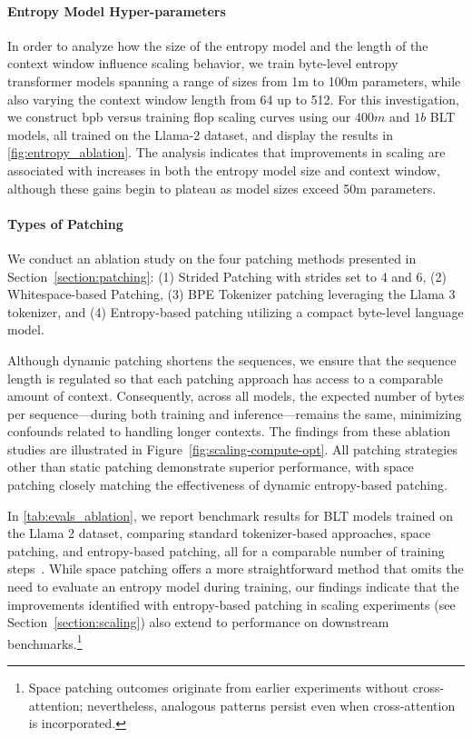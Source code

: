 \paragraph{Entropy Model Hyper-parameters} In order to analyze how the size of the entropy model and the length of the context window influence scaling behavior, we train byte-level entropy transformer models spanning a range of sizes from 1m to 100m parameters, while also varying the context window length from 64 up to 512. For this investigation, we construct bpb versus training flop scaling curves using our $400m$ and $1b$ {\textsc BLT} models, all trained on the Llama-2 dataset, and display the results in \autoref{fig:entropy_ablation}. The analysis indicates that improvements in scaling are associated with increases in both the entropy model size and context window, although these gains begin to plateau as model sizes exceed 50m parameters.

\paragraph{Types of Patching}

We conduct an ablation study on the four patching methods presented in Section~\ref{section:patching}: (1) Strided Patching with strides set to 4 and 6, (2) Whitespace-based Patching, (3) BPE Tokenizer patching leveraging the Llama 3 tokenizer, and (4) Entropy-based patching utilizing a compact byte-level language model.

Although dynamic patching shortens the sequences, we ensure that the sequence length is regulated so that each patching approach has access to a comparable amount of context. Consequently, across all models, the expected number of bytes per sequence—during both training and inference—remains the same, minimizing confounds related to handling longer contexts. The findings from these ablation studies are illustrated in Figure~\ref{fig:scaling-compute-opt}. All patching strategies other than static patching demonstrate superior performance, with space patching closely matching the effectiveness of dynamic entropy-based patching.

In \autoref{tab:evals_ablation}, we report benchmark results for {\textsc BLT} models trained on the Llama 2 dataset, comparing standard tokenizer-based approaches, space patching, and entropy-based patching, all for a comparable number of training steps~\citep{dubey2024llama}. While space patching offers a more straightforward method that omits the need to evaluate an entropy model during training, our findings indicate that the improvements identified with entropy-based patching in scaling experiments (see Section~\ref{section:scaling}) also extend to performance on downstream benchmarks.\footnote{Space patching outcomes originate from earlier experiments without cross-attention; nevertheless, analogous patterns persist even when cross-attention is incorporated.}

